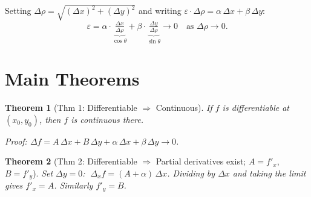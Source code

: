 \documentclass[12pt,a4paper]{article}
\newtheorem{theorem}{Theorem}
\begin{document}
Setting $\Delta\rho = \sqrt{(\Delta x)^2+(\Delta y)^2}$ and writing $\varepsilon\cdot\Delta\rho = \alpha\,\Delta x+\beta\,\Delta y$:
\[
  \varepsilon = \alpha\cdot\underbrace{\tfrac{\Delta x}{\Delta\rho}}_{\cos\theta}
              + \beta\cdot\underbrace{\tfrac{\Delta y}{\Delta\rho}}_{\sin\theta} \to 0
  \quad\text{as }\Delta\rho\to 0.
\]

\section*{Main Theorems}

\begin{theorem}[Thm 1: Differentiable $\Rightarrow$ Continuous]
If $f$ is differentiable at $(x_0,y_0)$, then $f$ is continuous there.

\textit{Proof}: $\Delta f = A\,\Delta x+B\,\Delta y+\alpha\,\Delta x+\beta\,\Delta y\to 0$.
\end{theorem}

\begin{theorem}[Thm 2: Differentiable $\Rightarrow$ Partial derivatives exist; $A=f'_x$, $B=f'_y$]
Set $\Delta y=0$: $\;\Delta_x f = (A+\alpha)\,\Delta x$. Dividing by $\Delta x$ and taking the limit gives $f'_x = A$. Similarly $f'_y = B$.
\end{theorem}
\end{document}
